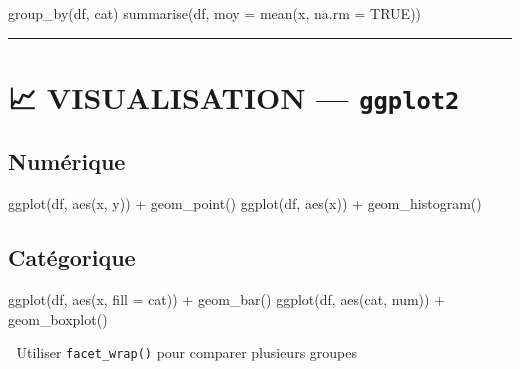 \documentclass[
  8pt,
  letterpaper,
  DIV=11,
  numbers=noendperiod]{scrartcl}
\newenvironment{Shaded}{\begin{snugshade}}{\end{snugshade}}
\newcommand{\AttributeTok}[1]{\textcolor[rgb]{0.40,0.45,0.13}{#1}}
\newcommand{\ConstantTok}[1]{\textcolor[rgb]{0.56,0.35,0.01}{#1}}
\newcommand{\FunctionTok}[1]{\textcolor[rgb]{0.28,0.35,0.67}{#1}}
\newcommand{\NormalTok}[1]{\textcolor[rgb]{0.00,0.23,0.31}{#1}}
\newcommand{\SpecialCharTok}[1]{\textcolor[rgb]{0.37,0.37,0.37}{#1}}
\begin{document}
\begin{Shaded}
\begin{Highlighting}[]
\FunctionTok{group\_by}\NormalTok{(df, cat)}
\FunctionTok{summarise}\NormalTok{(df, }\AttributeTok{moy =} \FunctionTok{mean}\NormalTok{(x, }\AttributeTok{na.rm =} \ConstantTok{TRUE}\NormalTok{))}
\end{Highlighting}
\end{Shaded}

\begin{center}\rule{0.5\linewidth}{0.5pt}\end{center}

\section{\texorpdfstring{📈 VISUALISATION ---
\texttt{ggplot2}}{📈 VISUALISATION --- ggplot2}}\label{visualisation-ggplot2}

\subsection{Numérique}\label{numuxe9rique}

\begin{Shaded}
\begin{Highlighting}[]
\FunctionTok{ggplot}\NormalTok{(df, }\FunctionTok{aes}\NormalTok{(x, y)) }\SpecialCharTok{+} \FunctionTok{geom\_point}\NormalTok{()}
\FunctionTok{ggplot}\NormalTok{(df, }\FunctionTok{aes}\NormalTok{(x)) }\SpecialCharTok{+} \FunctionTok{geom\_histogram}\NormalTok{()}
\end{Highlighting}
\end{Shaded}

\subsection{Catégorique}\label{catuxe9gorique}

\begin{Shaded}
\begin{Highlighting}[]
\FunctionTok{ggplot}\NormalTok{(df, }\FunctionTok{aes}\NormalTok{(x, }\AttributeTok{fill =}\NormalTok{ cat)) }\SpecialCharTok{+} \FunctionTok{geom\_bar}\NormalTok{()}
\FunctionTok{ggplot}\NormalTok{(df, }\FunctionTok{aes}\NormalTok{(cat, num)) }\SpecialCharTok{+} \FunctionTok{geom\_boxplot}\NormalTok{()}
\end{Highlighting}
\end{Shaded}

🧠 Utiliser \texttt{facet\_wrap()} pour comparer plusieurs groupes
\end{document}
